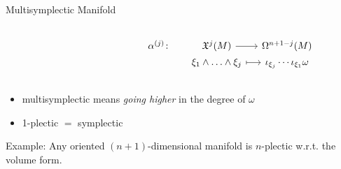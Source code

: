 \documentclass[handout,10pt]{beamer}
\begin{document}
\begin{frame}[fragile]{Multisymplectic Manifold}
			\begin{defblock}
				\begin{columns}
					\hfill
					\begin{column}{.4\linewidth}
					\end{column}
					\begin{column}{.6\linewidth}
						\[
						\begin{tikzcd}[column sep= small,row sep=0ex]
						    \alpha^{(j)} \colon& \mathfrak{X}^j(M) 	\arrow[r]& 				\Omega^{n+1-j}(M) \\
						  						& \xi_1\wedge\ldots\wedge\xi_j 						\arrow[r, mapsto]& 	\iota_{\xi_j}\cdots\iota_{\xi_1} \omega 					
						\end{tikzcd}	
						\]
					\end{column}
				\end{columns}
			\end{defblock}

			\begin{itemize}
					\item multisymplectic means \emph{going higher} in the degree of $\omega$
					\item 1-plectic $=$ symplectic
			\end{itemize}
			\vspace{1ex}
			\pause
			\begin{block}{Example:}
				Any oriented $(n+1)$-dimensional manifold is $n$-plectic w.r.t. the volume form.
			\end{block}			 


  \end{frame}
\end{document}
